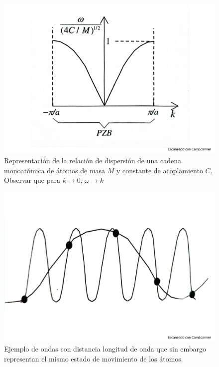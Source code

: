\begin{figure}[h!] \centering
    \includegraphics[scale=0.37]{Cuerpo/Ch_04/Fotos libro 2.pdf}
    \caption{Representación de la relación de dispersión de una cadena monoatómica de átomos de masa $M$ y constante de acoplamiento $C$. Observar que para $k\rightarrow 0$, $\omega \rightarrow k$}
    \label{Fig:04-02}
\end{figure}    

\begin{figure}[h!] \centering
    \includegraphics[scale=0.27]{Cuerpo/Ch_04/Fotos libro 3.pdf}
    \caption{Ejemplo de ondas con distancia longitud de onda que sin embargo representan el mismo estado de movimiento de los átomos.}
    \label{Fig:04-03}
\end{figure}    

